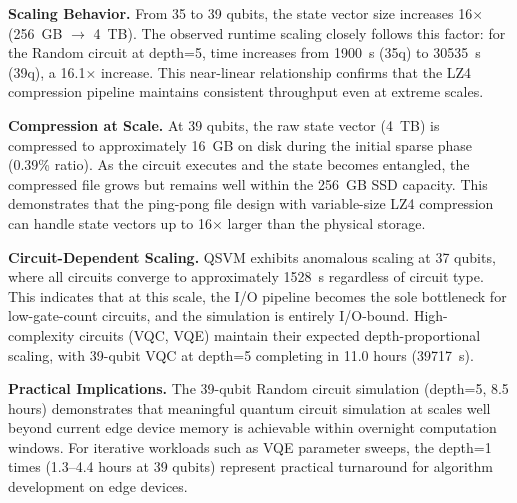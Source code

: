 \noindent\textbf{Scaling Behavior.}
From 35 to 39 qubits, the state vector size increases 16$\times$ (256~GB $\rightarrow$ 4~TB).
The observed runtime scaling closely follows this factor: for the Random circuit at depth=5, time increases from 1900~s (35q) to 30535~s (39q), a 16.1$\times$ increase.
This near-linear relationship confirms that the LZ4 compression pipeline maintains consistent throughput even at extreme scales.

\noindent\textbf{Compression at Scale.}
At 39 qubits, the raw state vector (4~TB) is compressed to approximately 16~GB on disk during the initial sparse phase (0.39\% ratio).
As the circuit executes and the state becomes entangled, the compressed file grows but remains well within the 256~GB SSD capacity.
This demonstrates that the ping-pong file design with variable-size LZ4 compression can handle state vectors up to 16$\times$ larger than the physical storage.

\noindent\textbf{Circuit-Dependent Scaling.}
QSVM exhibits anomalous scaling at 37 qubits, where all circuits converge to approximately 1528~s regardless of circuit type.
This indicates that at this scale, the I/O pipeline becomes the sole bottleneck for low-gate-count circuits, and the simulation is entirely I/O-bound.
High-complexity circuits (VQC, VQE) maintain their expected depth-proportional scaling, with 39-qubit VQC at depth=5 completing in 11.0 hours (39717~s).

\noindent\textbf{Practical Implications.}
The 39-qubit Random circuit simulation (depth=5, 8.5 hours) demonstrates that meaningful quantum circuit simulation at scales well beyond current edge device memory is achievable within overnight computation windows.
For iterative workloads such as VQE parameter sweeps, the depth=1 times (1.3--4.4 hours at 39 qubits) represent practical turnaround for algorithm development on edge devices.
